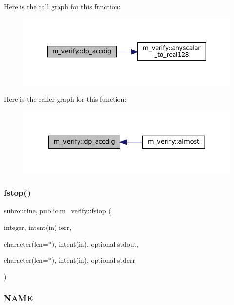 Here is the call graph for this function\+:\nopagebreak
\begin{figure}[H]
\begin{center}
\leavevmode
\includegraphics[width=343pt]{namespacem__verify_a7408df33e6934a8959fdeda8cc3fb5ff_cgraph}
\end{center}
\end{figure}
Here is the caller graph for this function\+:\nopagebreak
\begin{figure}[H]
\begin{center}
\leavevmode
\includegraphics[width=329pt]{namespacem__verify_a7408df33e6934a8959fdeda8cc3fb5ff_icgraph}
\end{center}
\end{figure}
\mbox{\label{namespacem__verify_a2695833d468118d68918d6aeabab6d0b}} 
\subsubsection{\texorpdfstring{fstop()}{fstop()}}
{\footnotesize\ttfamily subroutine, public m\+\_\+verify\+::fstop (\begin{DoxyParamCaption}\item[{integer, intent(in)}]{ierr,  }\item[{character(len=$\ast$), intent(in), optional}]{stdout,  }\item[{character(len=$\ast$), intent(in), optional}]{stderr }\end{DoxyParamCaption})}



\subsubsection*{N\+A\+ME}

